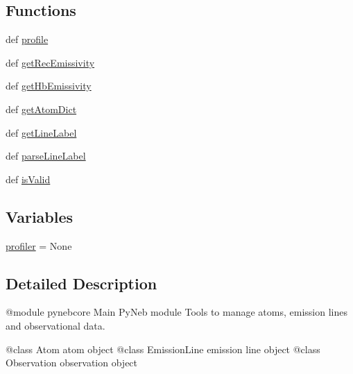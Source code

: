 \subsection*{Functions}
\begin{DoxyCompactItemize}
\item 
def \hyperlink{namespacepyneb_1_1core_1_1pynebcore_a2176f1dd03d32029b802581e9c187daf}{profile}
\item 
def \hyperlink{namespacepyneb_1_1core_1_1pynebcore_aba9d4a5306330dd47f8a51455514c017}{get\-Rec\-Emissivity}
\item 
def \hyperlink{namespacepyneb_1_1core_1_1pynebcore_a027537ead17492a35c3e4e940cd95223}{get\-Hb\-Emissivity}
\item 
def \hyperlink{namespacepyneb_1_1core_1_1pynebcore_a827f434ffd7a142d4ee91740b0174c1a}{get\-Atom\-Dict}
\item 
def \hyperlink{namespacepyneb_1_1core_1_1pynebcore_a14c882fc308d727f77ed33c1f56212e4}{get\-Line\-Label}
\item 
def \hyperlink{namespacepyneb_1_1core_1_1pynebcore_a15b88e2a4daeae68052060cb425c7a1c}{parse\-Line\-Label}
\item 
def \hyperlink{namespacepyneb_1_1core_1_1pynebcore_af6bc1553900518f0f154cafda868e1e4}{is\-Valid}
\end{DoxyCompactItemize}
\subsection*{Variables}
\begin{DoxyCompactItemize}
\item 
\hyperlink{namespacepyneb_1_1core_1_1pynebcore_a5adecc87efd257b54198f2064493502a}{profiler} = None
\end{DoxyCompactItemize}


\subsection{Detailed Description}
\begin{DoxyVerb}@module pynebcore
Main PyNeb module
Tools to manage atoms, emission lines and observational data.

@class Atom           atom object
@class EmissionLine   emission line object
@class Observation    observation object\end{DoxyVerb}
 

